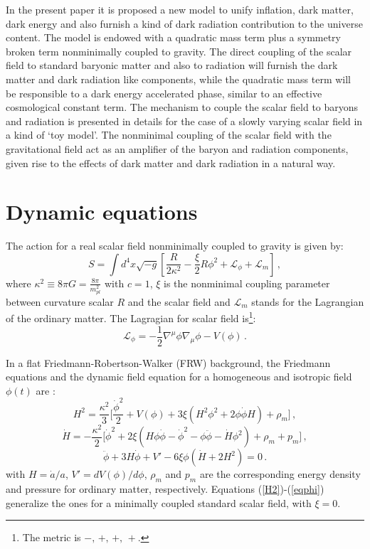 \documentclass[preprintnumbers,amsmath,amssymb,nofootinbib]{revtex4}
\begin{document}
In the present paper it is proposed a new model to unify inflation, dark matter, dark energy and also furnish a kind of dark radiation contribution to the universe content. The model is endowed with a quadratic mass term plus a symmetry broken term nonminimally coupled to gravity.
The direct coupling of the scalar field to standard baryonic matter and also to radiation will furnish the dark matter and dark radiation like components, while the quadratic mass term will be responsible to a dark energy accelerated phase, similar to an effective cosmological constant term. The mechanism to couple the scalar field to baryons and radiation is presented in details for the case of a slowly varying scalar field in a kind of `toy model'. The nonminimal coupling of the scalar field with the gravitational field act as an amplifier of the baryon and radiation components, given rise to the effects of dark matter and dark radiation in a natural way.  





\section{Dynamic equations}



 The action for a real scalar field nonminimally coupled to gravity is given by:
\begin{equation}
S = \int d^4 x \sqrt{-g} \left[ \frac{{R}}{2\kappa^2} -\frac{\xi}{2}R\phi^2 + \mathcal{L}_\phi +\mathcal{L}_m\right] \,,
\label{actionE}
\end{equation}
where $\kappa^2\equiv8\pi G = \frac{8\pi}{m_{pl}^{2}}$ with $c=1$, $\xi$ is the nonminimal coupling parameter between curvature scalar $R$ and the scalar field and $\mathcal{L}_m$ stands for the Lagrangian of the ordinary matter. The Lagragian for scalar field is\footnote{The metric is $-,\,+,\,+,\,+$.}:
\begin{equation}
    \mathcal{L}_\phi=-\frac{1}{2}\nabla^\mu \phi\nabla_\mu \phi -V(\phi)\,.
\end{equation}
  

In a flat Friedmann-Robertson-Walker (FRW) background, the Friedmann equations and the dynamic field equation for a homogeneous and isotropic field $\phi(t)$ are \cite{faraoni2001}:
\begin{equation}
H^2=\frac{\kappa^2}{3}\bigg[\frac{\dot{\phi}^2}{2}+V(\phi)+3\xi (H^2 \phi^2+2 \phi\dot{\phi}H)+\rho_m\bigg]\,,\label{H2}
\end{equation}
\begin{equation}
    \dot{H}=-\frac{\kappa^2}{2}\bigg[ \dot{\phi}^2 +2\xi(H\phi\dot{\phi}-\dot{\phi}^2-\phi\ddot{\phi}-\dot{H}\phi^2)+\rho_m+p_m\bigg]\,,\label{Hdot}
\end{equation}
\begin{equation}
\ddot{\phi}+3H\dot{\phi}+V'- 6\xi\phi(\dot{H}+2H^2)=0\,.\label{eqphi}
\end{equation}
with $H=\dot{a}/a$, $V' = {dV(\phi)/ d\phi}$, $\rho_m$ and $p_m$ are the corresponding energy density and pressure for ordinary matter, respectively. Equations (\ref{H2})-(\ref{eqphi}) generalize the ones for a minimally coupled standard scalar field, with $\xi=0$.
\end{document}
